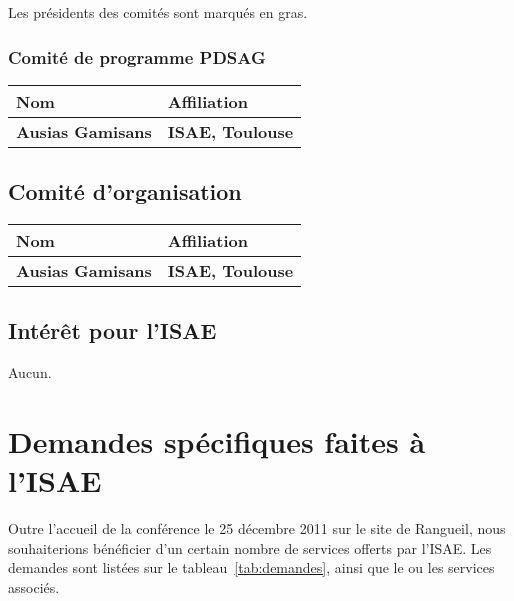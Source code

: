 \documentclass[fr]{supaero-orga}
\begin{document}
Les présidents des comités sont marqués en gras.

\subsubsection{Comité de programme PDSAG}
\label{sec:comite-scient-pdsag}

\begin{center}
  \begin{tabular}{l l}
    \toprule[1.5pt]
    \textbf{Nom} & \textbf{Affiliation}\\
    \midrule
    \textbf{Ausias Gamisans} & \textbf{ISAE, Toulouse} \\ 
    \bottomrule[1.5pt]
  \end{tabular}
\end{center}

\subsection{Comité d'organisation}
\label{sec:comite-dorganisation}

\begin{center}
  \begin{tabular}{l l}
    \toprule[1.5pt]
    \textbf{Nom} & \textbf{Affiliation}\\
    \midrule
    \textbf{Ausias Gamisans} & \textbf{ISAE, Toulouse}\\
    \bottomrule[1.5pt]
  \end{tabular}
\end{center}

\subsection{Intérêt pour l'ISAE}
\label{sec:interet-pour-lisae}

Aucun.

\section{Demandes spécifiques faites à l'ISAE}
\label{sec:demand-spec-lisae}

Outre l'accueil de la conférence le 25 décembre 2011 sur le site de
Rangueil, nous souhaiterions bénéficier d'un certain nombre de
services offerts par l'ISAE. Les demandes sont listées sur le
tableau~\ref{tab:demandes}, ainsi que le ou les services associés.
\end{document}
